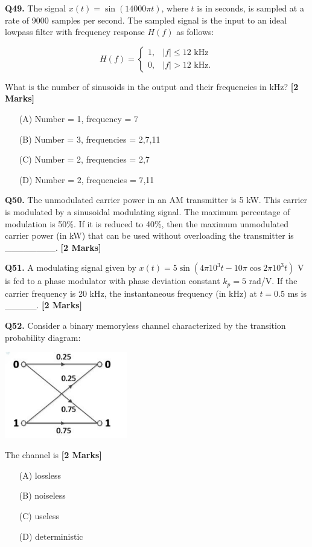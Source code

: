\documentclass[11pt]{article}
\newcommand{\questionb}[2]{
    \noindent\textbf{Q#2.} #1 \hfill \textbf{[2 Marks]}
}
\begin{document}
\vspace{0.5cm}

\questionb{The signal \( x(t) = \sin(14000\pi t) \), where \( t \) is in seconds, is sampled at a rate of 9000 samples per second. The sampled signal is the input to an ideal lowpass filter with frequency response \( H(f) \) as follows:

\[
H(f) = 
\begin{cases} 
1, & |f| \leq 12 \text{ kHz} \\
0, & |f| > 12 \text{ kHz} .
\end{cases}
\]

What is the number of sinusoids in the output and their frequencies in kHz?}{49}
\begin{enumerate}
    \item[(A)] Number = 1, frequency = 7
    \item[(B)] Number = 3, frequencies = 2,7,11
    \item[(C)] Number = 2, frequencies = 2,7
    \item[(D)] Number = 2, frequencies = 7,11
\end{enumerate}

\vspace{0.5cm}

\questionb{The unmodulated carrier power in an AM transmitter is 5 kW. This carrier is modulated by a sinusoidal modulating signal. The maximum percentage of modulation is 50\%. If it is reduced to 40\%, then the maximum unmodulated carrier power (in kW) that can be used without overloading the transmitter is \_\_\_\_\_\_\_\_.}{50}

\vspace{0.5cm}

\questionb{A modulating signal given by $x(t) = 5\sin(4\pi 10^{3}t - 10\pi\cos 2\pi 10^{3}t)$ V is fed to a phase modulator with phase deviation constant $k_p = 5$ rad/V. If the carrier frequency is 20 kHz, the instantaneous frequency (in kHz) at $t = 0.5$ ms is \_\_\_\_\_.}{51}

\vspace{0.5cm}

\questionb{Consider a binary memoryless channel characterized by the transition probability diagram:
\begin{center}
\includegraphics[width=0.4\textwidth]{figures/52.png}
\end{center}
The channel is}{52}
\begin{enumerate}
    \item[(A)] lossless
    \item[(B)] noiseless
    \item[(C)] useless
    \item[(D)] deterministic
\end{enumerate}
\end{document}
